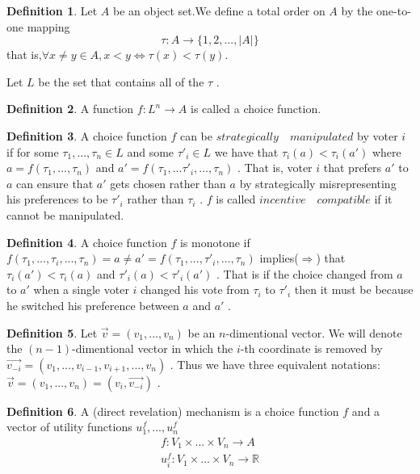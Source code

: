 \documentclass[10pt,reqno]{amsart}
\theoremstyle{definition}
\newtheorem{defn}{Definition}[section]
\theoremstyle{remark}
\numberwithin{equation}{section}
\begin{document}
\begin{defn}
Let $A$ be an object set.We define a total order on $A$ by the one-to-one mapping
$$\tau:A\rightarrow \{1,2,...,|A|\}$$
that is,$\forall x\not=y\in A,x<y\Leftrightarrow \tau(x)<\tau(y)$.

Let $L$ be the set that contains all of the $\tau$ .
\end{defn}

\begin{defn}
A function $f:L^n\rightarrow A$ is called a choice function.
\end{defn}

\begin{defn}
A choice function $f$ can be $strategically\quad manipulated$ by voter $i$ if for some $\tau_1,...,\tau_n\in L$ and some $\tau'_i\in L$ we have that $\tau_i(a)<\tau_i(a')$ where $a=f(\tau_1,...,\tau_n)$ and $a'=f(\tau_1,...\tau'_i,...,\tau_n)$ . That is, voter $i$ that prefers $a'$ to $a$ can ensure that $a'$ gets chosen rather than $a$ by strategically misrepresenting his preferences to be $\tau'_i$ rather than $\tau_i$ . $f$ is called $incentive\quad compatible$ if it cannot be manipulated.
\end{defn}

\begin{defn}
A choice function $f$ is monotone if $f(\tau_1,...,\tau_i,...,\tau_n)=a\not=a'=f(\tau_1,...,\tau'_i,...,\tau_n)$ implies($\Rightarrow$) that $\tau_i(a')<\tau_i(a)$ and $\tau'_i(a)<\tau'_i(a')$ . That is if the choice changed from $a$ to $a'$ when a single voter $i$ changed his vote from $\tau_i$ to $\tau'_i$ then it must be because he switched his preference between $a$ and $a'$ .
\end{defn}


\begin{defn}
Let $\vec{v}=(v_1,...,v_n)$ be an $n$-dimentional vector. We will denote the $(n-1)$-dimentional vector in which the $i$-th coordinate is removed by $\vec{v_{-i}}=(v_1,...,v_{i-1},v_{i+1},...,v_n)$ . Thus we have three equivalent notations:$\vec{v}=(v_1,...,v_n)=(v_i,\vec{v_{-i}})$ .
\end{defn}


\begin{defn}
A (direct revelation) mechanism is a choice function $f$ and a vector of utility functions $u_1^f,...,u_n^f$
\begin{eqnarray}
f:V_1\times ... \times V_n \rightarrow A\\
u_i^f :V_1\times ... \times V_n \rightarrow \mathbb{R}
\end{eqnarray}
\end{defn}
\end{document}
